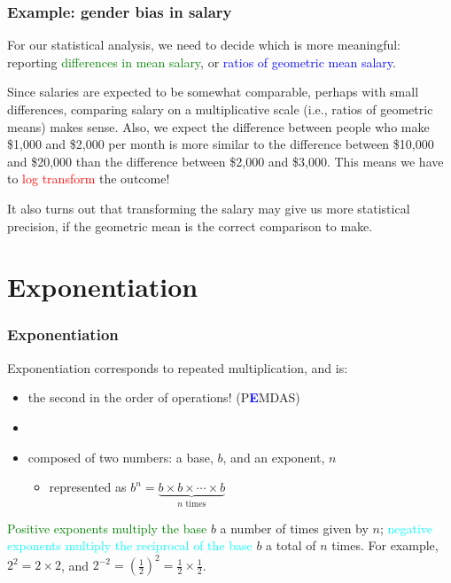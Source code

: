 \documentclass[11pt]{beamer}
\newcommand{\myframe}[1]{\begin{frame} \frametitle{#1}}
\begin{document}
\myframe{Example: gender bias in salary}
For our statistical analysis, we need to decide which is more meaningful: reporting \textcolor{green}{differences in mean salary}, or \textcolor{blue}{ratios of geometric mean salary}. \pause

Since salaries are expected to be somewhat comparable, perhaps with small differences, comparing salary on a multiplicative scale (i.e., ratios of geometric means) makes sense. \pause Also, we expect the difference between people who make \$1,000 and \$2,000 per month is more similar to the difference between \$10,000 and \$20,000 than the difference between \$2,000 and \$3,000. \pause This means we have to \textcolor{red}{log transform} the outcome! \pause

It also turns out that transforming the salary may give us more statistical precision, if the geometric mean is the correct comparison to make.
\end{frame}

\section{Exponentiation}
\myframe{Exponentiation}
Exponentiation corresponds to repeated multiplication, and is: \pause
\begin{itemize}
\item the second in the order of operations! (P\textcolor{blue}{{\textbf E}}MDAS)
\item[] \pause
\item composed of two numbers: a base, $b$, and an exponent, $n$ \pause
\begin{itemize}
\item represented as $b^n = \underbrace{b\times b \times \cdots \times b}_\text{$n$ times}$
\end{itemize}
\end{itemize} \pause

\textcolor{green}{Positive exponents multiply the base} $b$ a number of times given by $n$; \pause \textcolor{cyan}{negative exponents multiply the reciprocal of the base} $b$ a total of $n$ times. For example, $2^2 = 2\times 2$, and $2^{-2} = \left(\frac{1}{2}\right)^2 = \frac{1}{2}\times \frac{1}{2}$.
\end{frame}
\end{document}
